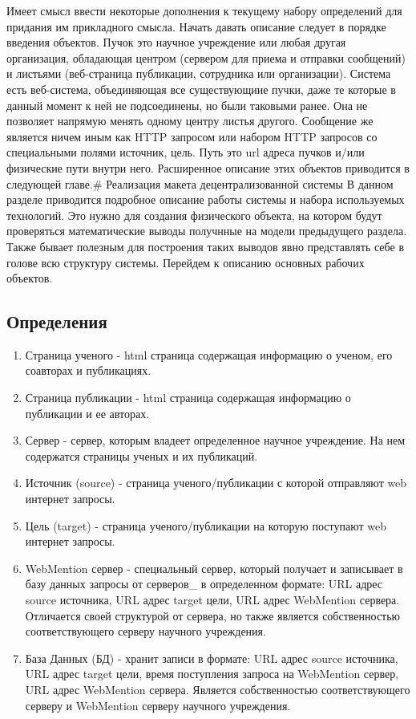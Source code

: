 Имеет смысл ввести некоторые дополнения к текущему набору определений
для придания им прикладного смысла. Начать давать описание следует в
порядке введения объектов. Пучок это научное учреждение или любая другая
организация, обладающая центром (сервером для приема и отправки
сообщений) и листьями (веб-страница публикации, сотрудника или
организации). Система есть веб-система, объединяющая все существующиие
пучки, даже те которые в данный момент к ней не подсоединены, но были
таковыми ранее. Она не позволяет напрямую менять одному центру листья
другого. Сообщение же является ничем иным как HTTP запросом или набором
HTTP запросов со специальными полями источник, цель. Путь это url адреса
пучков и/или физические пути внутри него. Расширенное описание этих
объектов приводится в следующей главе.\# Реализация макета
децентрализованной системы В данном разделе приводится подробное
описание работы системы и набора используемых технологий. Это нужно для
создания физического объекта, на котором будут проверяться
математические выводы получнные на модели предыдущего раздела. Также
бывает полезным для построения таких выводов явно представлять себе в
голове всю структуру системы. Перейдем к описанию основных рабочих
объектов.

\hypertarget{ux43eux43fux440ux435ux434ux435ux43bux435ux43dux438ux44f-1}{%
\subsection{Определения}\label{ux43eux43fux440ux435ux434ux435ux43bux435ux43dux438ux44f-1}}

\begin{enumerate}
\def\labelenumi{\arabic{enumi}.}
\tightlist
\item
  Страница ученого - html страница содержащая информацию о ученом, его
  соавторах и публикациях.
\item
  Страница публикации - html страница содержащая информацию о публикации
  и ее авторах.
\item
  Сервер - сервер, которым владеет определенное научное учреждение. На
  нем содержатся страницы ученых и их публикаций.
\item
  Источник (source) - страница ученого/публикации с которой отправляют
  web интернет запросы.
\item
  Цель (target) - страница ученого/публикации на которую поступают web
  интернет запросы.
\item
  WebMention сервер - специальный сервер, который получает и записывает
  в базу данных запросы от серверов\_ в определенном формате: URL адрес
  source источника, URL адрес target цели, URL адрес WebMention сервера.
  Отличается своей структурой от сервера, но также является
  собственностью соответствующего серверу научного учреждения.
\item
  База Данных (БД) - хранит записи в формате: URL адрес source
  источника, URL адрес target цели, время поступления запроса на
  WebMention сервер, URL адрес WebMention сервера. Является
  собственностью соответствующего серверу и WebMention серверу научного
  учреждения.
\end{enumerate}

